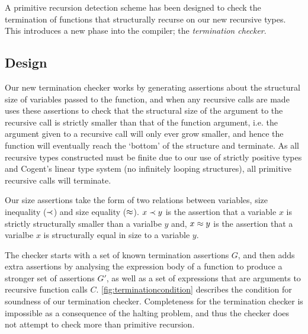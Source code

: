 A primitive recursion detection scheme has been designed to check the termination
of functions that structurally recurse on our new recursive types. This introduces
a new phase into the compiler; the \textit{termination checker}.

\subsection{Design}

Our new termination checker works by generating assertions about the structural
size of variables passed to the function, and when any recursive calls are made 
uses these assertions to check that the structural size of the argument to the
recursive call is strictly smaller than that of the function argument, i.e. the argument
given to a recursive call will only ever grow smaller, and hence the function will
eventually reach the `bottom' of the structure and terminate.
As all recursive types constructed must be finite due to our use of strictly positive
types and Cogent's linear type system (no infinitely looping structures),
all primitive recursive calls will terminate.

Our size assertions take the form of two relations between variables, 
size inequality ($\prec$) and size equality ($\approx$).
$x \prec y$ is the assertion that a variable $x$ is strictly
structurally smaller than a varialbe $y$ and, $x \approx y$ is the assertion that a
varialbe $x$ is structurally equal in size to a variable $y$.

The checker starts with a set of known termination assertions $G$, and then adds
extra assertions by analysing the expression body of a function to produce
a stronger set of assertions $G'$, as well as a set of expressions that are arguments
to recursive function calls $C$. \autoref{fig:terminationcondition} describes the
condition for soundness of our termination checker. Completeness for the termination
checker is impossible as a consequence of the halting problem, and thus the checker
does not attempt to check more than primitive recursion.

